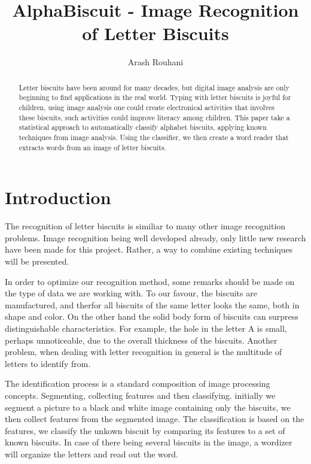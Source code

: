 \documentclass[a4paper,11pt]{article}
\title{AlphaBiscuit - Image Recognition of Letter Biscuits}
\author{Arash Rouhani}
\begin{document}
\maketitle

\begin{abstract}
    Letter biscuits have been around for many decades, but digital image
analysis are only beginning to find applications in the real world.
Typing with letter biscuits is joyful for children, using image analysis
one could create electronical activities that involves these biscuits,
such activities could improve literacy among children. This paper take
a statistical approach to automatically classify alphabet biscuits,
applying known techniques from image analysis. Using the classifier, we
then create a word reader that extracts words from an image of letter
biscuits.

\end{abstract}

\section{Introduction}
The recognition of letter biscuits is similiar to many other image recognition problems.
Image recognition being well developed already, only little new research have been made for this project.
Rather, a way to combine existing techniques will be presented.

In order to optimize our recognition method, some remarks should be made on the type of data we are working with.
To our favour, the biscuits are manufactured, and therfor all biscuits of the same letter looks the same, both in shape and color. 
On the other hand the solid body form of biscuits can surpress distinguishable characteristics. For example, the hole in the letter A is small, perhaps unnoticeable, due to the overall thickness of the biscuits. Another problem, when dealing with letter recognition in general is the multitude of letters to identify from.

The identification process is a standard composition of image processing concepts. Segmenting, collecting features and then classifying.
initially we segment a picture to a black and white image containing only the biscuits, 
we then collect features from the segmented image. 
The classification is based on the features, we classify the unkown biscuit by comparing its features to a set of known biscuits.
In case of there being several biscuits in the image, a wordizer will organize the letters and read out the word.
\end{document}

